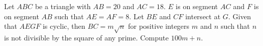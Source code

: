Let $ABC$ be a triangle with $AB=20$ and $AC=18$. $E$ is on segment $AC$ and $F$ is on segment $AB$ such that $AE=AF=8$. Let $BE$ and $CF$ intersect at $G$. Given that $AEGF$ is cyclic, then $BC=m\sqrt{n}$ for positive integers $m$ and $n$ such that $n$ is not divisible by the square of any prime. Compute $100m+n$.
